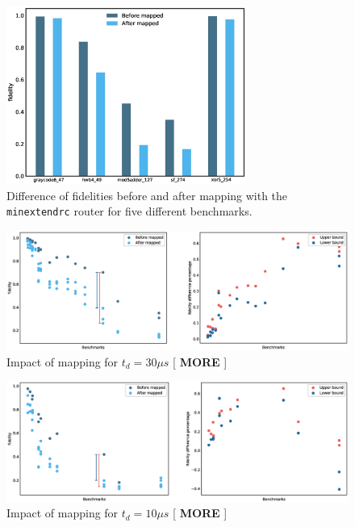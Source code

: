 \begin{figure}[htbp]
\centering
\includegraphics[width=0.7\textwidth]{figures/f_diff_bar_plot.eps}
\caption{\label{fig:f_diff_bar_plot}
Difference of fidelities before and after mapping with the \texttt{minextendrc} router for five different benchmarks.}
\end{figure}
\begin{figure}[htbp]
\centering
\includegraphics[width=\textwidth]{figures/mapping_effect_3000_both.eps}
\caption{\label{fig:mapping_effect_3000_both}
Impact of mapping for \(t_d = 30 \mu s\) [ \textbf{MORE} ]}
\end{figure}

\begin{figure}[htbp]
\centering
\includegraphics[width=\textwidth]{figures/mapping_effect_1000_both.eps}
\caption{\label{fig:mapping_effect_1000_both}
Impact of mapping for \(t_d = 10 \mu s\) [ \textbf{MORE} ]}
\end{figure}



